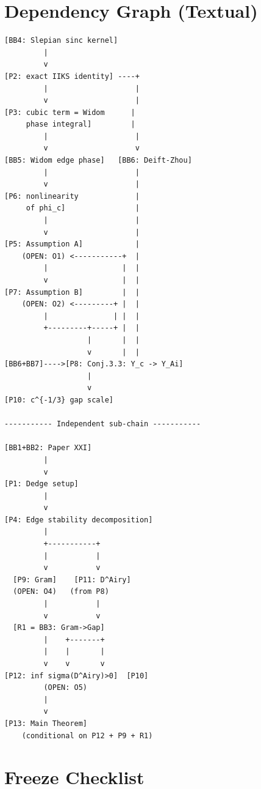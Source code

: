 \documentclass[12pt,a4paper]{amsart}
\theoremstyle{definition}
\begin{document}
\section{Dependency Graph (Textual)}
\label{sec:dag_textual}

\begin{verbatim}
[BB4: Slepian sinc kernel]
         |
         v
[P2: exact IIKS identity] ----+
         |                    |
         v                    |
[P3: cubic term = Widom      |
     phase integral]         |
         |                    |
         v                    v
[BB5: Widom edge phase]   [BB6: Deift-Zhou]
         |                    |
         v                    |
[P6: nonlinearity             |
     of phi_c]                |
         |                    |
         v                    |
[P5: Assumption A]            |
    (OPEN: O1) <-----------+  |
         |                 |  |
         v                 |  |
[P7: Assumption B]         |  |
    (OPEN: O2) <---------+ |  |
         |               | |  |
         +---------+-----+ |  |
                   |       |  |
                   v       |  |
[BB6+BB7]---->[P8: Conj.3.3: Y_c -> Y_Ai]
                   |
                   v
[P10: c^{-1/3} gap scale]

----------- Independent sub-chain -----------

[BB1+BB2: Paper XXI]
         |
         v
[P1: Dedge setup]
         |
         v
[P4: Edge stability decomposition]
         |
         +-----------+
         |           |
         v           v
  [P9: Gram]    [P11: D^Airy]
  (OPEN: O4)   (from P8)
         |           |
         v           v
  [R1 = BB3: Gram->Gap]
         |    +-------+
         |    |       |
         v    v       v
[P12: inf sigma(D^Airy)>0]  [P10]
         (OPEN: O5)
         |
         v
[P13: Main Theorem]
    (conditional on P12 + P9 + R1)
\end{verbatim}

\section{Freeze Checklist}
\label{sec:freeze}
\end{document}

